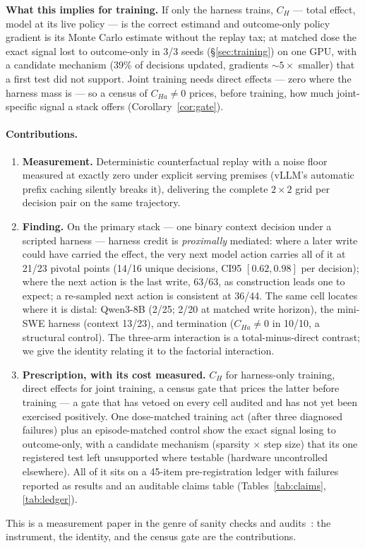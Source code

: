 \documentclass{article}
\theoremstyle{remark}
\begin{document}
\textbf{What this implies for training.} If only the harness trains,
$C_H$ --- total effect, model at its live policy --- is the correct
estimand and outcome-only policy gradient is its Monte Carlo estimate
without the replay tax; at matched dose the exact signal lost to
outcome-only in 3/3 seeds (\S\ref{sec:training}) on one GPU, with a
candidate mechanism (39\% of decisions updated, gradients $\sim 5\times$
smaller) that a first test did not support. Joint training needs direct effects --- zero where the harness
mass is --- so a census of $C_{Ha} \neq 0$ prices, before training, how
much joint-specific signal a stack offers (Corollary~\ref{cor:gate}).

\paragraph{Contributions.}
\begin{enumerate}
\item \textbf{Measurement.} Deterministic counterfactual replay with a
noise floor measured at exactly zero under explicit serving premises
(vLLM's automatic prefix caching silently breaks it), delivering the
complete $2\times 2$ grid per decision pair on the same trajectory.
\item \textbf{Finding.} On the primary stack --- one binary context
decision under a scripted harness --- harness credit is \emph{proximally}
mediated: where a later write could have carried the effect, the very
next model action carries all of it at 21/23 pivotal points (14/16
unique decisions, CI95 $[0.62, 0.98]$ per decision); where the next
action is the last write, 63/63, as construction leads one to expect; a
re-sampled
next action is consistent at 36/44. The same cell locates where it is
distal: Qwen3-8B (2/25; 2/20 at matched write horizon), the mini-SWE
harness (context 13/23), and termination ($C_{Ha} \neq 0$ in 10/10, a
structural control). The three-arm interaction is a total-minus-direct
contrast; we give the identity relating it to the factorial interaction.
\item \textbf{Prescription, with its cost measured.} $C_H$ for
harness-only training, direct effects for joint training, a census gate
that prices the latter before training --- a gate that has vetoed on
every cell audited and has not yet been exercised positively. One
dose-matched training act (after three diagnosed failures) plus an
episode-matched control show the exact signal losing to outcome-only,
with a candidate mechanism (sparsity $\times$ step size) that its one
registered test left unsupported where testable (hardware uncontrolled
elsewhere). All of it sits on a 45-item pre-registration ledger with
failures reported as results and an auditable claims table
(Tables~\ref{tab:claims}, \ref{tab:ledger}).
\end{enumerate}
This is a measurement paper in the genre of sanity checks and
audits~\citep{adebayo2018sanity,lucic2018gans,schaeffer2023mirage,
henderson2018deep}: the instrument, the identity, and the census gate are
the contributions.
\end{document}
